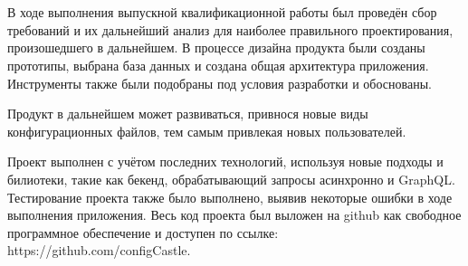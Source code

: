 \section*{}

В ходе выполнения выпускной квалификационной работы был проведён сбор требований и их дальнейший анализ
для наиболее правильного проектирования, произошедшего в дальнейшем.
В процессе дизайна продукта были созданы прототипы, выбрана база данных и создана
общая архитектура приложения. Инструменты также были подобраны под условия разработки и
обоснованы.

Продукт в дальнейшем может развиваться, привнося новые виды конфигурационных файлов, тем самым привлекая новых пользователей.

Проект выполнен с учётом последних технологий, используя новые подходы и билиотеки, такие как бекенд, обрабатывающий запросы асинхронно и GraphQL.
Тестирование проекта также было выполнено, выявив некоторые ошибки в ходе выполнения приложения. Весь код проекта был выложен
на github как свободное программное обеспечение и доступен по ссылке: https://github.com/configCastle.